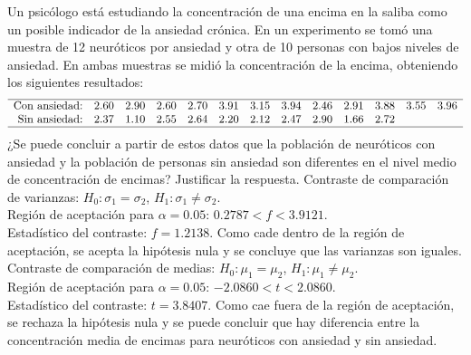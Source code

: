 {Un psicólogo está estudiando la concentración de una encima en la saliba como un posible indicador de la ansiedad crónica.
En un experimento se tomó una muestra de 12 neuróticos por ansiedad y otra de 10 personas con bajos niveles de ansiedad.
En ambas muestras se midió la concentración de la encima, obteniendo los siguientes resultados:
\[
\begin{array}{rcccccccccccc}
\hline
\mbox{Con ansiedad:} & 2.60 & 2.90 & 2.60 & 2.70 & 3.91 & 3.15 & 3.94 & 2.46 & 2.91 & 3.88 & 3.55 & 3.96\\
\mbox{Sin ansiedad:} & 2.37 & 1.10 & 2.55 & 2.64 & 2.20 & 2.12 & 2.47 & 2.90 & 1.66 & 2.72 \\
\hline
\end{array}
\]
¿Se puede concluir a partir de estos datos que la población de neuróticos con ansiedad y la población de personas sin
ansiedad son diferentes en el nivel medio de concentración de encimas?
Justificar la respuesta.
}
{
Contraste de comparación de varianzas: $H_0:\sigma_1=\sigma_2$, $H_1:\sigma_1\neq\sigma_2$.\\
Región de aceptación para $\alpha=0.05$: $0.2787<f<3.9121$.\\
Estadístico del contraste: $f=1.2138$. Como cade dentro de la región de aceptación, se acepta la hipótesis nula y se
concluye que las varianzas son iguales.\\
Contraste de comparación de medias: $H_0:\mu_1=\mu_2$, $H_1:\mu_1\neq\mu_2$.\\
Región de aceptación para $\alpha=0.05$: $-2.0860<t<2.0860$.\\
Estadístico del contraste: $t=3.8407$. Como cae fuera de la región de aceptación, se rechaza la hipótesis nula y
se puede concluir que hay diferencia entre la concentración media de encimas para neuróticos con ansiedad y sin ansiedad.
}
{}



